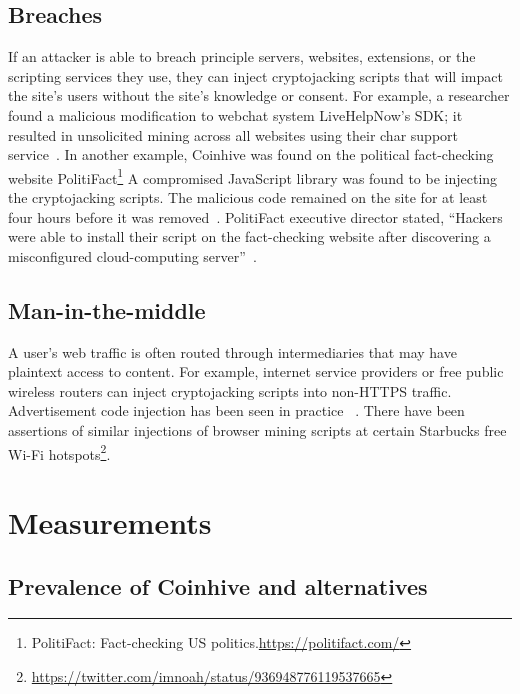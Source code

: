 \subsection{Breaches} 


If an attacker is able to breach principle servers, websites, extensions, or the scripting services they use, they can inject cryptojacking scripts that will impact the site's users without the site's knowledge or consent. For example, a researcher found a malicious modification to webchat system LiveHelpNow's SDK; it resulted in unsolicited mining across all websites using their char support service~\cite{chatsupporthack}. In another example, Coinhive was found on the political fact-checking website PolitiFact\footnote{PolitiFact: Fact-checking US politics.\url{https://politifact.com/}} A compromised JavaScript library was found to be injecting the cryptojacking scripts. The malicious code remained on the site for at least four hours before it was removed~\cite{politifactcoinhive}. PolitiFact executive director stated, ``Hackers were able to install their script on the fact-checking website after discovering a misconfigured cloud-computing server''~\cite{politifactcoinhivewsj}.


\subsection{Man-in-the-middle} 

A user's web traffic is often routed through intermediaries that may have plaintext access to content. For example, internet service providers or free public wireless routers can inject cryptojacking scripts into non-HTTPS traffic. Advertisement code injection has been seen in practice ~\cite{vergeadinjection}. There have been assertions of similar injections of browser mining scripts at certain Starbucks free Wi-Fi hotspots\footnote{\url{https://twitter.com/imnoah/status/936948776119537665}}.






%
%
%
%
%
%

\section{Measurements}

\subsection{Prevalence of Coinhive and alternatives}

